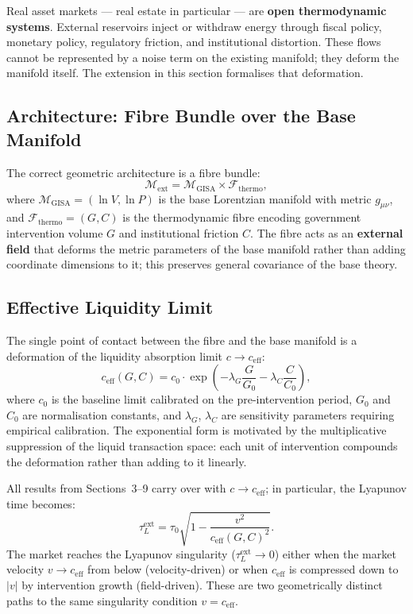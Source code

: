 \documentclass[12pt,a4paper]{article}
\begin{document}
Real asset markets --- real estate in particular --- are
\textbf{open thermodynamic systems}. External reservoirs inject or
withdraw energy through fiscal policy, monetary policy, regulatory
friction, and institutional distortion. These flows cannot be
represented by a noise term on the existing manifold; they deform the
manifold itself. The extension in this section formalises that
deformation.

\subsection{Architecture: Fibre Bundle over the Base Manifold}

The correct geometric architecture is a fibre bundle:
\begin{equation}
    \mathcal{M}_{\mathrm{ext}} = \mathcal{M}_{\mathrm{GISA}}
    \times \mathcal{F}_{\mathrm{thermo}},
\end{equation}
where $\mathcal{M}_{\mathrm{GISA}} = (\ln V, \ln P)$ is the base
Lorentzian manifold with metric $g_{\mu\nu}$, and
$\mathcal{F}_{\mathrm{thermo}} = (G, C)$ is the thermodynamic fibre
encoding government intervention volume $G$ and institutional friction
$C$. The fibre acts as an \textbf{external field} that deforms the
metric parameters of the base manifold rather than adding coordinate
dimensions to it; this preserves general covariance of the base theory.

\subsection{Effective Liquidity Limit}

The single point of contact between the fibre and the base manifold is
a deformation of the liquidity absorption limit $c \to c_{\mathrm{eff}}$:
\begin{equation}
    \label{eq:ceff}
    \boxed{c_{\mathrm{eff}}(G,C) = c_0 \cdot
    \exp\!\left(-\lambda_G \frac{G}{G_0}
               - \lambda_C \frac{C}{C_0}\right)},
\end{equation}
where $c_0$ is the baseline limit calibrated on the pre-intervention
period, $G_0$ and $C_0$ are normalisation constants, and $\lambda_G$,
$\lambda_C$ are sensitivity parameters requiring empirical calibration.
The exponential form is motivated by the multiplicative suppression of
the liquid transaction space: each unit of intervention compounds the
deformation rather than adding to it linearly.

All results from Sections~3--9 carry over with $c \to c_{\mathrm{eff}}$;
in particular, the Lyapunov time becomes:
\begin{equation}
    \tau_L^{\mathrm{ext}} = \tau_0
    \sqrt{1 - \frac{v^2}{c_{\mathrm{eff}}(G,C)^2}}.
\end{equation}
The market reaches the Lyapunov singularity ($\tau_L^{\mathrm{ext}}
\to 0$) either when the market velocity $v \to c_{\mathrm{eff}}$ from
below (velocity-driven) or when $c_{\mathrm{eff}}$ is compressed down
to $|v|$ by intervention growth (field-driven). These are two
geometrically distinct paths to the same singularity condition
$v = c_{\mathrm{eff}}$.
\end{document}
